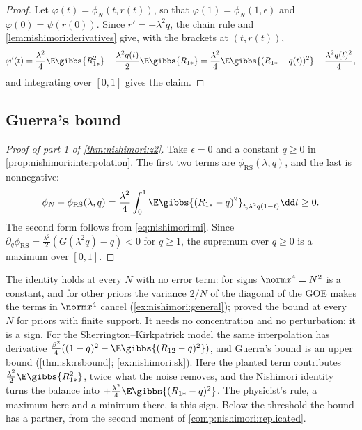 \begin{refsection}
\begin{proof}
Let $\varphi(t)=\phi_N(t,r(t))$, so that $\varphi(1)=\phi_N(1,\epsilon)$ and $\varphi(0)=\psi(r(0))$. Since $r'=-\lambda^2q$, the chain rule and \cref{lem:nishimori:derivatives} give, with the brackets at $(t,r(t))$,
\[
\varphi'(t)=\frac{\lambda^2}4\E\gibbs{R_{1*}^2}-\frac{\lambda^2q(t)}2\E\gibbs{R_{1*}}=\frac{\lambda^2}4\E\gibbs{(R_{1*}-q(t))^2}-\frac{\lambda^2q(t)^2}4,
\]
and integrating over $[0,1]$ gives the claim.
\end{proof}

\subsection{Guerra's bound}\label{sec:nishimori:guerra}

\begin{proof}[Proof of part 1 of \cref{thm:nishimori:z2}]
Take $\epsilon=0$ and a constant $q\ge0$ in \cref{prop:nishimori:interpolation}. The first two terms are $\phi_{\mathrm{RS}}(\lambda,q)$, and the last is nonnegative:
\[
\phi_N-\phi_{\mathrm{RS}}(\lambda,q)=\frac{\lambda^2}4\int_0^1\E\gibbs{(R_{1*}-q)^2}_{t,\lambda^2q(1-t)}\dd t\ge0.
\]
The second form follows from \eqref{eq:nishimori:mi}. Since $\partial_q\phi_{\mathrm{RS}}=\frac{\lambda^2}2(G(\lambda^2q)-q)<0$ for $q\ge1$, the supremum over $q\ge0$ is a maximum over $[0,1]$.\qedhere
\end{proof}

The identity holds at every $N$ with no error term: for signs $\norm x^4=N^2$ is a constant, and for other priors the variance $2/N$ of the diagonal of the GOE makes the terms in $\norm x^4$ cancel (\cref{ex:nishimori:general}); \textcite{KrzakalaXuZdeborova2016} proved the bound at every $N$ for priors with finite support. It needs no concentration and no perturbation: it is a sign. For the Sherrington--Kirkpatrick model the same interpolation has derivative $\frac{\beta^2}4((1-q)^2-\E\gibbs{(R_{12}-q)^2})$, and Guerra's bound is an upper bound (\cref{thm:sk:rsbound}; \cref{ex:nishimori:sk}). Here the planted term contributes $\frac{\lambda^2}2\E\gibbs{R_{1*}^2}$, twice what the noise removes, and the Nishimori identity turns the balance into $+\frac{\lambda^2}4\E\gibbs{(R_{1*}-q)^2}$. The physicist's rule, a maximum here and a minimum there, is this sign. Below the threshold the bound has a partner, from the second moment of \cref{comp:nishimori:replicated}.


\end{refsection}
